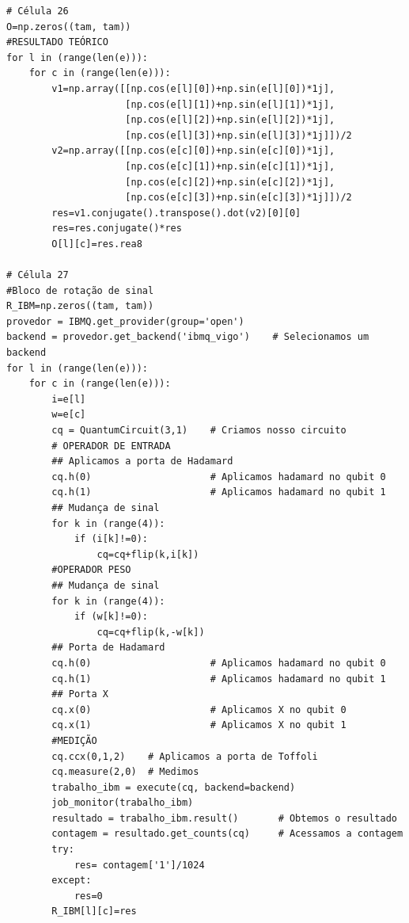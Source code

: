 \begin{verbatim}
# Célula 26
O=np.zeros((tam, tam))
#RESULTADO TEÓRICO
for l in (range(len(e))):
    for c in (range(len(e))):
        v1=np.array([[np.cos(e[l][0])+np.sin(e[l][0])*1j],
                     [np.cos(e[l][1])+np.sin(e[l][1])*1j],
                     [np.cos(e[l][2])+np.sin(e[l][2])*1j],
                     [np.cos(e[l][3])+np.sin(e[l][3])*1j]])/2
        v2=np.array([[np.cos(e[c][0])+np.sin(e[c][0])*1j],
                     [np.cos(e[c][1])+np.sin(e[c][1])*1j],
                     [np.cos(e[c][2])+np.sin(e[c][2])*1j],
                     [np.cos(e[c][3])+np.sin(e[c][3])*1j]])/2
        res=v1.conjugate().transpose().dot(v2)[0][0]
        res=res.conjugate()*res
        O[l][c]=res.rea8

# Célula 27
#Bloco de rotação de sinal
R_IBM=np.zeros((tam, tam))
provedor = IBMQ.get_provider(group='open')           
backend = provedor.get_backend('ibmq_vigo')    # Selecionamos um backend
for l in (range(len(e))):
    for c in (range(len(e))):
        i=e[l]
        w=e[c]
        cq = QuantumCircuit(3,1)    # Criamos nosso circuito        
        # OPERADOR DE ENTRADA
        ## Aplicamos a porta de Hadamard
        cq.h(0)                     # Aplicamos hadamard no qubit 0
        cq.h(1)                     # Aplicamos hadamard no qubit 1        
        ## Mudança de sinal
        for k in (range(4)):
            if (i[k]!=0):
                cq=cq+flip(k,i[k])
        #OPERADOR PESO
        ## Mudança de sinal
        for k in (range(4)):
            if (w[k]!=0):
                cq=cq+flip(k,-w[k])
        ## Porta de Hadamard
        cq.h(0)                     # Aplicamos hadamard no qubit 0
        cq.h(1)                     # Aplicamos hadamard no qubit 1
        ## Porta X
        cq.x(0)                     # Aplicamos X no qubit 0
        cq.x(1)                     # Aplicamos X no qubit 1
        #MEDIÇÃO
        cq.ccx(0,1,2)    # Aplicamos a porta de Toffoli
        cq.measure(2,0)  # Medimos
        trabalho_ibm = execute(cq, backend=backend)    
        job_monitor(trabalho_ibm)
        resultado = trabalho_ibm.result()       # Obtemos o resultado
        contagem = resultado.get_counts(cq)     # Acessamos a contagem
        try:
            res= contagem['1']/1024
        except:
            res=0
        R_IBM[l][c]=res


\end{verbatim}
